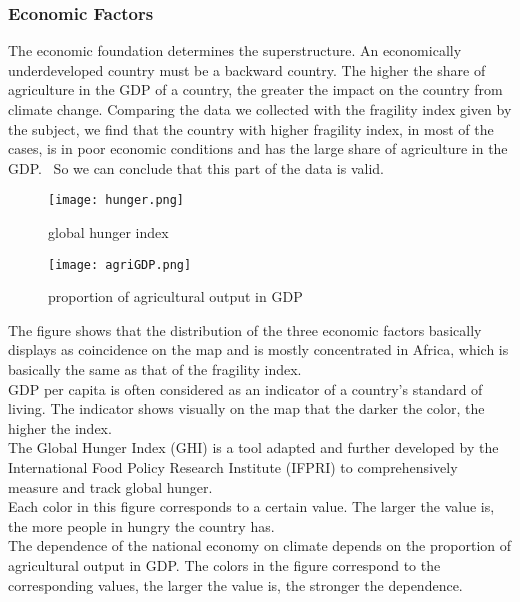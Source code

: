 \documentclass{mcmthesis}
\begin{document}
\subsubsection{Economic Factors}
The economic foundation determines the superstructure. An economically underdeveloped country must be a backward country. The higher the share of agriculture in the GDP of a country, the greater the impact on the country from climate change.
Comparing the data we collected with the fragility index given by the subject, we find that the country with higher fragility index, in most of the cases, is in poor economic conditions and has the large share of agriculture in the GDP.  So we can conclude that this part of the data is valid.\\
\begin{figure}[h]
  \centering
  \begin{minipage}[h]{0.48\textwidth}
  \centering
  \texttt{[image: hunger.png]}
  \caption{global hunger index}
  \end{minipage}
  \begin{minipage}[h]{0.48\textwidth}
  \centering
  \texttt{[image: agriGDP.png]}
  \caption{proportion of agricultural output in GDP}
  \end{minipage}
\end{figure}
The figure shows that the distribution of the three economic factors basically displays as coincidence on the map and is mostly concentrated in Africa, which is basically the same as that of the fragility index.\\
GDP per capita is often considered as an indicator of a country's standard of living. The indicator shows visually on the map that the darker the color, the higher the index.\\
The Global Hunger Index (GHI) is a tool adapted and further developed by the International Food Policy Research Institute (IFPRI) to comprehensively measure and track global hunger.\\
Each color in this figure corresponds to a certain value. The larger the value is, the more people in hungry the country has.\\
The dependence of the national economy on climate depends on the proportion of agricultural output in GDP. The colors in the figure correspond to the corresponding values, the larger the value is, the stronger the dependence.
\end{document}
